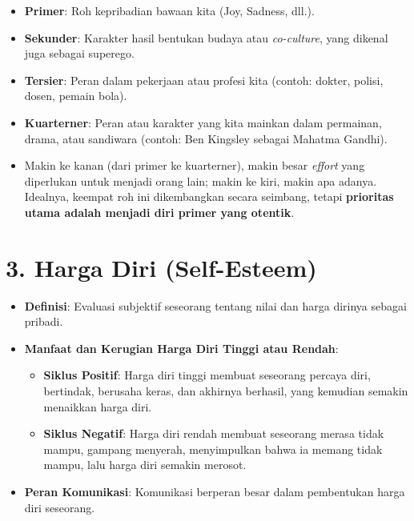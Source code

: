 \documentclass[
  letterpaper,
  DIV=11,
  numbers=noendperiod]{scrreprt}
\providecommand{\tightlist}{%
  \setlength{\itemsep}{0pt}\setlength{\parskip}{0pt}}
\begin{document}
\begin{itemize}
  \begin{itemize}
  \tightlist
  \item
    \textbf{Primer}: Roh kepribadian bawaan kita (Joy, Sadness, dll.).
  \item
    \textbf{Sekunder}: Karakter hasil bentukan budaya atau
    \emph{co-culture}, yang dikenal juga sebagai superego.
  \item
    \textbf{Tersier}: Peran dalam pekerjaan atau profesi kita (contoh:
    dokter, polisi, dosen, pemain bola).
  \item
    \textbf{Kuarterner}: Peran atau karakter yang kita mainkan dalam
    permainan, drama, atau sandiwara (contoh: Ben Kingsley sebagai
    Mahatma Gandhi).
  \item
    Makin ke kanan (dari primer ke kuarterner), makin besar
    \emph{effort} yang diperlukan untuk menjadi orang lain; makin ke
    kiri, makin apa adanya. Idealnya, keempat roh ini dikembangkan
    secara seimbang, tetapi \textbf{prioritas utama adalah menjadi diri
    primer yang otentik}.
  \end{itemize}
\end{itemize}

\section{3. Harga Diri (Self-Esteem)}\label{harga-diri-self-esteem}

\begin{itemize}
\tightlist
\item
  \textbf{Definisi}: Evaluasi subjektif seseorang tentang nilai dan
  harga dirinya sebagai pribadi.
\item
  \textbf{Manfaat dan Kerugian Harga Diri Tinggi atau Rendah}:

  \begin{itemize}
  \tightlist
  \item
    \textbf{Siklus Positif}: Harga diri tinggi membuat seseorang percaya
    diri, bertindak, berusaha keras, dan akhirnya berhasil, yang
    kemudian semakin menaikkan harga diri.
  \item
    \textbf{Siklus Negatif}: Harga diri rendah membuat seseorang merasa
    tidak mampu, gampang menyerah, menyimpulkan bahwa ia memang tidak
    mampu, lalu harga diri semakin merosot.
  \end{itemize}
\item
  \textbf{Peran Komunikasi}: Komunikasi berperan besar dalam pembentukan
  harga diri seseorang.
\end{itemize}
\end{document}
